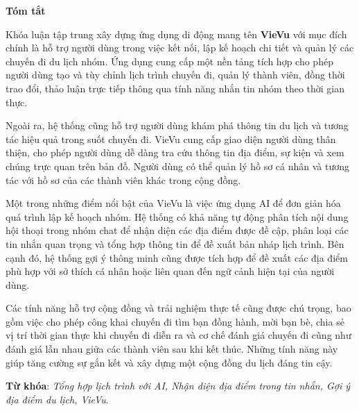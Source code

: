 
\begin{center}
\textbf{\large{Tóm tắt}}
\end{center}
Khóa luận tập trung xây dựng ứng dụng di động mang tên \textbf{VieVu} với mục đích chính là hỗ trợ người dùng trong việc kết nối, lập kế hoạch chi tiết và quản lý các chuyến đi du lịch nhóm. Ứng dụng cung cấp một nền tảng tích hợp cho phép người dùng tạo và tùy chỉnh lịch trình chuyến đi, quản lý thành viên, đồng thời trao đổi, thảo luận trực tiếp thông qua tính năng nhắn tin nhóm theo thời gian thực.

Ngoài ra, hệ thống cũng hỗ trợ người dùng khám phá thông tin du lịch và tương tác hiệu quả trong suốt chuyến đi. VieVu cung cấp giao diện người dùng thân thiện, cho phép người dùng dễ dàng tra cứu thông tin địa điểm, sự kiện và xem chúng trực quan trên bản đồ. Người dùng có thể quản lý hồ sơ cá nhân và tương tác với hồ sơ của các thành viên khác trong cộng đồng.

Một trong những điểm nổi bật của VieVu là việc ứng dụng AI để đơn giản hóa quá trình lập kế hoạch nhóm. Hệ thống có khả năng tự động phân tích nội dung hội thoại trong nhóm chat để nhận diện các địa điểm được đề cập, phân loại các tin nhắn quan trọng và tổng hợp thông tin để đề xuất bản nháp lịch trình. Bên cạnh đó, hệ thống gợi ý thông minh cũng được tích hợp để đề xuất các địa điểm phù hợp với sở thích cá nhân hoặc liên quan đến ngữ cảnh hiện tại của người dùng.

Các tính năng hỗ trợ cộng đồng và trải nghiệm thực tế cũng được chú trọng, bao gồm việc cho phép công khai chuyến đi tìm bạn đồng hành, mời bạn bè, chia sẻ vị trí thời gian thực khi chuyến đi diễn ra và cơ chế đánh giá chuyến đi cũng như đánh giá lẫn nhau giữa các thành viên sau khi kết thúc. Những tính năng này giúp tăng cường sự gắn kết và xây dựng một cộng đồng du lịch đáng tin cậy.

\vspace{0.5cm} 
\textbf{Từ khóa}: \textit{Tổng hợp lịch trình với AI, Nhận diện địa điểm trong tin nhắn, Gợi ý địa điểm du lịch, VieVu}.
    